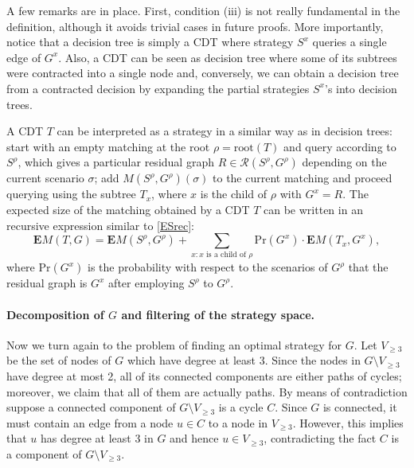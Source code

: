 \documentclass[12pt]{article}
\newcommand{\ro}[1]{\textrm{root}(#1)}
\newcommand{\Mf}[2]{M(#1,#2)}
\newcommand{\EMf}[2]{\mathbf{E}M(#1,#2)}
\begin{document}
	 A few remarks are in place. First, condition (iii) is not really fundamental in the definition, although it avoids trivial cases in future proofs. More importantly, notice that a decision tree is simply a CDT where strategy $S^x$ queries a single edge of $G^x$. Also, a CDT can be seen as decision tree where some of its subtrees were contracted into a single node and, conversely, we can obtain a decision tree from a contracted decision by expanding the partial strategies $S^x$'s into decision trees.
	
	A CDT $T$ can be interpreted as a strategy in a similar way as in decision trees: start with an empty matching at the root $\rho = \ro{T}$ and query according to $S^\rho$, which gives a particular residual graph $R \in \mathcal{R}(S^\rho, G^\rho)$ depending on the current scenario $\sigma$; add $\Mf{S^\rho}{G^\rho}(\sigma)$ to the current matching and proceed querying using the subtree $T_x$, where $x$ is the child of $\rho$ with $G^x = R$. The expected size of the matching obtained by a CDT $T$ can be written in an recursive expression similar to \eqref{ESrec}:
\begin{equation}
		\EMf{T}{G} = \EMf{S^\rho}{G^\rho} + \sum_{x : x \textrm{ is a child of } \rho} \textrm{Pr}(G^x) \cdot \EMf{T_x}{G^x}, \label{ESrecCDT}
	\end{equation}
	where $\textrm{Pr}(G^x)$ is the probability with respect to the scenarios of $G^\rho$ that the residual graph is $G^x$ after employing $S^\rho$ to $G^\rho$.
	
	\paragraph{Decomposition of $G$ and filtering of the strategy space.} Now we turn again to the problem of finding an optimal strategy for $G$. Let $V_{\ge 3}$ be the set of nodes of $G$ which have degree at least 3. Since the nodes in $G \setminus V_{\ge 3}$ have degree at most 2, all of its connected components are either paths of cycles; moreover, we claim that all of them are actually paths. By means of contradiction suppose a connected component of $G \setminus V_{\ge 3}$ is a cycle $C$. Since $G$ is connected, it must contain an edge from a node $u \in C$ to a node in $V_{\ge 3}$. However, this implies that $u$ has degree at least 3 in $G$ and hence $u \in V_{\ge 3}$, contradicting the fact $C$ is a component of $G \setminus V_{\ge 3}$.	
	
\end{document}
